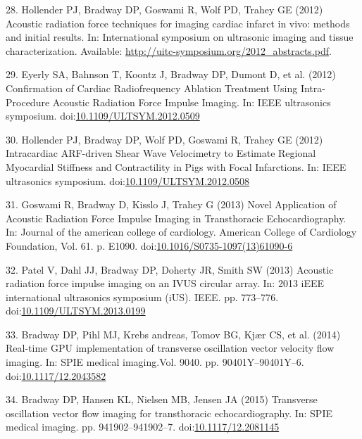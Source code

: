 \documentclass[]{article}
\begin{document}
28. Hollender PJ, Bradway DP, Goswami R, Wolf PD, Trahey GE (2012)
Acoustic radiation force techniques for imaging cardiac infarct in vivo:
methods and initial results. In: International symposium on ultrasonic
imaging and tissue characterization. Available:
\url{http://uitc-symposium.org/2012_abstracts.pdf}.

29. Eyerly SA, Bahnson T, Koontz J, Bradway DP, Dumont D, et al. (2012)
Confirmation of Cardiac Radiofrequency Ablation Treatment Using
Intra-Procedure Acoustic Radiation Force Impulse Imaging. In: IEEE
ultrasonics symposium.
doi:\href{http://dx.doi.org/10.1109/ULTSYM.2012.0509}{10.1109/ULTSYM.2012.0509}

30. Hollender PJ, Bradway DP, Wolf PD, Goswami R, Trahey GE (2012)
Intracardiac ARF-driven Shear Wave Velocimetry to Estimate Regional
Myocardial Stiffness and Contractility in Pigs with Focal Infarctions.
In: IEEE ultrasonics symposium.
doi:\href{http://dx.doi.org/10.1109/ULTSYM.2012.0508}{10.1109/ULTSYM.2012.0508}

31. Goswami R, Bradway D, Kisslo J, Trahey G (2013) Novel Application of
Acoustic Radiation Force Impulse Imaging in Transthoracic
Echocardiography. In: Journal of the american college of cardiology.
American College of Cardiology Foundation, Vol. 61. p. E1090.
doi:\href{http://dx.doi.org/10.1016/S0735-1097(13)61090-6}{10.1016/S0735-1097(13)61090-6}

32. Patel V, Dahl JJ, Bradway DP, Doherty JR, Smith SW (2013) Acoustic
radiation force impulse imaging on an IVUS circular array. In: 2013 iEEE
international ultrasonics symposium (iUS). IEEE. pp. 773--776.
doi:\href{http://dx.doi.org/10.1109/ULTSYM.2013.0199}{10.1109/ULTSYM.2013.0199}

33. Bradway DP, Pihl MJ, Krebs andreas, Tomov BG, Kjær CS, et al. (2014)
Real-time GPU implementation of transverse oscillation vector velocity
flow imaging. In: SPIE medical imaging.Vol. 9040. pp. 90401Y--90401Y--6.
doi:\href{http://dx.doi.org/10.1117/12.2043582}{10.1117/12.2043582}

34. Bradway DP, Hansen KL, Nielsen MB, Jensen JA (2015) Transverse
oscillation vector flow imaging for transthoracic echocardiography. In:
SPIE medical imaging. pp. 941902--941902--7.
doi:\href{http://dx.doi.org/10.1117/12.2081145}{10.1117/12.2081145}
\end{document}
